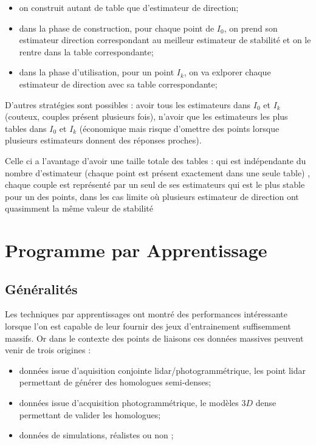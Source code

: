\begin{itemize}
    \item on construit autant de table que d'estimateur de direction;
    \item dans la phase de construction, pour chaque point de $I_0$, 
          on prend son estimateur direction correspondant au meilleur estimateur 
          de stabilit\'e  et on le rentre dans la table correspondante;
    \item dans la phase d'utilisation, pour un point $I_k$, on va exlporer
          chaque estimateur de direction avec sa table correspondante;
\end{itemize}

D'autres strat\'egies sont possibles : avoir tous les estimateurs dans $I_0$ et
$I_k$ (couteux, couples pr\'esent plusieurs fois), n'avoir que les estimateurs les plus tables dans $I_0$ et $I_k$
(\'economique mais risque d'omettre des points lorsque plusieurs estimateurs donnent des r\'eponses proches).


Celle ci a l'avantage d'avoir une taille totale
des tables : qui est ind\'ependante du nombre d'estimateur (chaque point est pr\'esent exactement dans
une seule table) , chaque couple est repr\'esent\'e par un seul de ses estimateurs qui est
le plus stable pour un des points, dans les cas limite o\`u plusieurs estimateur de direction
ont quasimment la m\^eme valeur de stabilit\'e



\section{Programme par Apprentissage}


\subsection{G\'en\'eralit\'es}

Les techniques par apprentissages ont montr\'e des performances int\'eressante lorsque 
l'on est capable de leur fournir des jeux d'entrainement suffisemment massifs.
Or dans le contexte des points de liaisons ces donn\'ees massives peuvent venir de trois 
origines :

\begin{itemize}
    \item donn\'ees issue d'aquisition conjointe lidar/photogramm\'etrique, les point lidar
          permettant de g\'en\'erer des homologues semi-denses;  

    \item donn\'ees issue d'acquisition photogramm\'etrique, le mod\`eles $3D$ dense
          permettant  de valider les homologues;

    \item donn\'ees de simulations, r\'ealistes ou non ;
\end{itemize}




